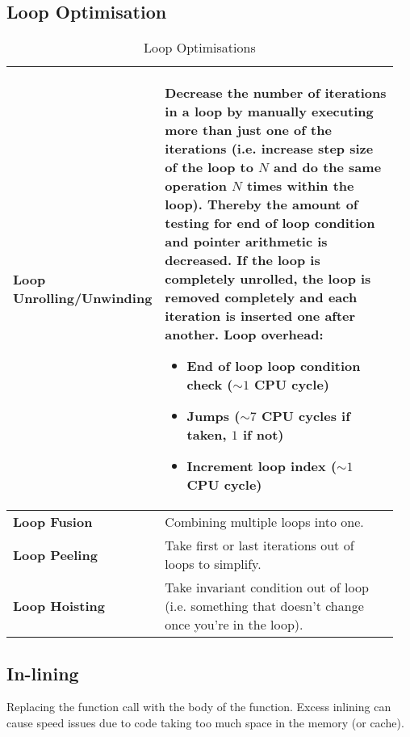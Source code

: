 	\subsection{Loop Optimisation }				
		\begin{table}[H]
			\centering
			\begin{tabular}{|>{\bfseries}p{0.3\linewidth}|p{0.65\linewidth}|}
					\hline
					Loop Unrolling/Unwinding
						& Decrease the number of iterations in a loop by manually executing more than just one of the iterations (i.e. increase step size of the loop to $N$ and do the same operation $N$ times within the loop). Thereby the amount of testing for end of loop condition and pointer arithmetic is decreased. If the loop is completely unrolled, the loop is removed completely and each iteration is inserted one after another.\newline
						\textbf{Loop overhead:}\newline
						\begin{itemize}
						  \item End of loop loop condition check ($\sim 1$ CPU cycle)
						  \item Jumps ($\sim 7$ CPU cycles if taken, $1$ if not)
						  \item Increment loop index ($\sim 1$ CPU cycle)
						\end{itemize}\\
					\hline
					Loop Fusion
						& Combining multiple loops into one.\\
					\hline
					Loop Peeling
						& Take first or last iterations out of loops to simplify.\\
					\hline
					Loop Hoisting
						& Take invariant condition out of loop (i.e. something that doesn't change once you're in the loop).\\
					\hline
			\end{tabular}
			\caption{Loop Optimisations}
		\end{table}
		
		
	\subsection{In-lining}
		Replacing the function call with the body of the function. Excess inlining can cause speed issues due to code taking too much space in the memory (or cache).